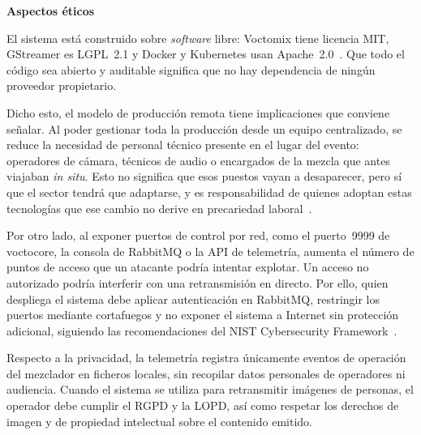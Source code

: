 \vspace{0.15cm}
\noindent\textbf{Aspectos éticos}\\
\normalsize{El sistema está construido sobre \textit{software} libre: Voctomix tiene licencia MIT,
GStreamer es LGPL~2.1 y Docker y Kubernetes usan Apache~2.0~\cite{apache2_license}.
Que todo el código sea abierto y auditable significa que no hay dependencia de ningún
proveedor propietario.

Dicho esto, el modelo de producción remota tiene implicaciones que conviene señalar. Al poder
gestionar toda la producción desde un equipo centralizado, se reduce la necesidad de personal
técnico presente en el lugar del evento: operadores de cámara, técnicos de audio o encargados de
la mezcla que antes viajaban \textit{in situ}. Esto no significa que esos puestos vayan a desaparecer,
pero sí que el sector tendrá que adaptarse, y es responsabilidad de quienes adoptan estas
tecnologías que ese cambio no derive en precariedad laboral~\cite{acemoglu2019automation}.

Por otro lado, al exponer puertos de control por red, como el puerto~9999 de voctocore, la
consola de RabbitMQ o la \ac{API} de telemetría, aumenta el número de puntos de acceso que un atacante podría intentar explotar.
Un acceso no autorizado podría interferir con una retransmisión en directo. Por ello, quien despliega el
sistema debe aplicar autenticación en RabbitMQ, restringir los puertos mediante cortafuegos y no
exponer el sistema a Internet sin protección adicional, siguiendo las recomendaciones del
\ac{NIST} Cybersecurity Framework~\cite{nist_csf2}.

Respecto a la privacidad, la telemetría registra únicamente eventos de operación del mezclador
en ficheros locales, sin recopilar datos personales de operadores ni audiencia. Cuando el sistema
se utiliza para retransmitir imágenes de personas, el operador debe cumplir el \ac{RGPD} y la
\ac{LOPD}, así como respetar los derechos de imagen y de propiedad intelectual sobre el contenido
emitido.}

